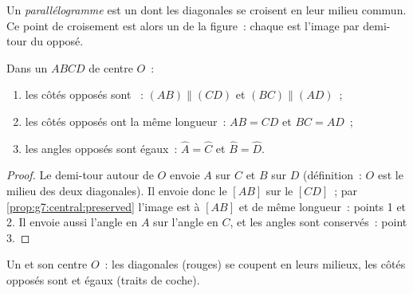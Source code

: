 \begin{definition}[Parallélogramme]\label{def:g7:central:parallelogram}
Un \emph{parallélogramme} est un 
dont les diagonales se croisent en leur milieu commun. Ce point de
croisement est alors un  de la figure~: chaque
 est l'image par demi-tour du  opposé.
\end{definition}

\begin{theorem}\label{thm:g7:central:properties}
Dans un  $ABCD$ de centre $O$~:
\begin{enumerate}
  \item les côtés opposés sont ~: $(AB) \parallel (CD)$ et
        $(BC) \parallel (AD)$~;
  \item les côtés opposés ont la même longueur~: $AB = CD$ et
        $BC = AD$~;
  \item les angles opposés sont égaux~: $\widehat A = \widehat C$ et
        $\widehat B = \widehat D$.
\end{enumerate}
\end{theorem}

\begin{proof}
Le demi-tour autour de $O$ envoie $A$ sur $C$ et $B$ sur $D$
(définition~: $O$ est le milieu des deux diagonales). Il envoie donc
le  $[AB]$ sur le  $[CD]$~; par
\cref{prop:g7:central:preserved} l'image est  à $[AB]$ et de
même longueur~: points 1 et 2. Il envoie aussi l'angle en $A$ sur
l'angle en $C$, et les angles sont conservés~: point 3.
\end{proof}

\begin{omfigure}

{\small Un  et son centre $O$~: les diagonales (rouges)
se coupent en leurs milieux, les côtés opposés sont  et
égaux (traits de coche).}
\end{omfigure}

